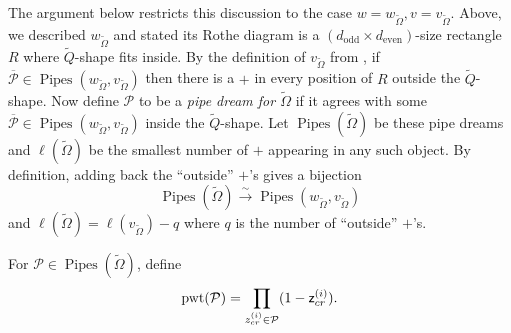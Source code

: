 \documentclass[12pt]{amsart}
\theoremstyle{definition}
\theoremstyle{remark}
\begin{document}
The argument below restricts this discussion to the case $w=w_{\widetilde \Omega},v=v_{\widetilde \Omega}$. 
Above, we described $w_{\widetilde \Omega}$ and stated its Rothe diagram
is a $(d_{\operatorname{odd}}\times d_{\operatorname{even}})$-size rectangle $R$ where ${\widetilde Q}$-shape fits inside.
By the definition of $v_{\widetilde \Omega}$ from \cite{KKR}, if $\overline{\mathcal P}\in \operatorname{Pipes}(w_{\widetilde \Omega},v_{\widetilde 
\Omega})$ then there is a $+$
in every position of $R$ outside the ${\widetilde Q}$-shape. Now define ${\mathcal P}$ to be a \emph{pipe dream for 
$\widetilde \Omega$} if it agrees with some $\overline{\mathcal P}\in \operatorname{Pipes}(w_{\widetilde \Omega},v_{\widetilde \Omega})$ 
inside the ${\widetilde Q}$-shape. Let $\operatorname{Pipes}(\widetilde \Omega)$ be these pipe dreams
and $\ell(\widetilde\Omega)$ be the smallest number of $+$ appearing in any such object. 
By definition, 
adding back
the ``outside'' $+$'s gives a  bijection 
\begin{equation}
\label{eqn:Jul16yyy}
\operatorname{Pipes}(\widetilde \Omega) \xrightarrow{\sim}  \operatorname{Pipes}(w_{\widetilde \Omega},v_{\widetilde \Omega})
\end{equation}
 and 
$\ell(\widetilde\Omega)=\ell(v_{\widetilde\Omega})-q$ where $q$ is the number of ``outside'' $+$'s.

For ${\mathcal P}\in \operatorname{Pipes}(\widetilde \Omega)$, define
\[\operatorname{pwt}({\mathcal P})=\prod_{z_{cr}^{(i)}\in \mathcal P} (1-{\sf z}_{cr}^{(i)}).\]
\end{document}
